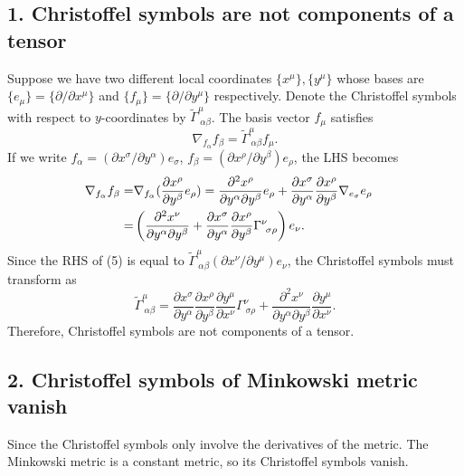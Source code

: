 \documentclass{article}
\begin{document}
\subsection*{1. Christoffel symbols are not components of a tensor}
Suppose we have two different local coordinates $\{x^\mu\}, \{y^\mu\}$ whose bases are $\{e_\mu\}=\{\partial/\partial x^\mu\}$ and $\{f_\mu\}=\{\partial/\partial y^\mu\}$ respectively. Denote the Christoffel symbols with respect to $y$-coordinates by $\widetilde{\Gamma}^\mu_{~\alpha\beta}$. The basis vector $f_\mu$ satisfies
\begin{equation}
\nabla_{f_\alpha} f_\beta = \widetilde{\Gamma}^\mu_{~\alpha \beta}f_\mu.
\end{equation}
If we write $f_\alpha = (\partial x^\sigma/ \partial y^\alpha)e_\sigma$, $f_\beta = (\partial x^\rho/ \partial y^\beta)e_\rho$, the LHS becomes
\begin{align}
\nabla_{f_\alpha} f_\beta =& \nabla_{f_\alpha}(\frac{\partial{x^\rho}}{\partial{y^\beta}}e_\rho)
=\frac{\partial^2 x^\rho}{\partial y^\alpha \partial y^\beta}e_\rho+\frac{\partial x^\sigma}{\partial y^\alpha}\frac{\partial x^\rho}{\partial y^\beta}\nabla_{e_\sigma}e_\rho\cr
=&\left(\frac{\partial^2 x^\nu}{\partial y^\alpha \partial y^\beta} + \frac{\partial x^\sigma}{\partial y^\alpha}\frac{\partial x^\rho}{\partial y^\beta} \Gamma^\nu_{~\sigma \rho} \right)e_\nu.
\end{align}
Since the RHS of (5) is equal to $\widetilde{\Gamma}^\mu_{~\alpha\beta} (\partial x^\nu / \partial y^\mu)e_\nu$, the Christoffel symbols must transform as
\begin{equation}
\widetilde{\Gamma}^\mu_{~\alpha\beta} = \frac{\partial x^\sigma}{\partial y^\alpha}\frac{\partial x^\rho}{\partial y^\beta} \frac{\partial y^\mu}{\partial x^\nu}\Gamma^\nu_{~\sigma \rho}
+\frac{\partial^2 x^\nu}{\partial y^\alpha \partial y^\beta} \frac{\partial y^\mu}{\partial x^\nu}.\end{equation}
Therefore, Christoffel symbols are not components of a tensor.

\subsection*{2. Christoffel symbols of Minkowski metric vanish}
Since the Christoffel symbols only involve the derivatives of the metric. The Minkowski metric is a constant metric, so its Christoffel symbols vanish.
\end{document}
